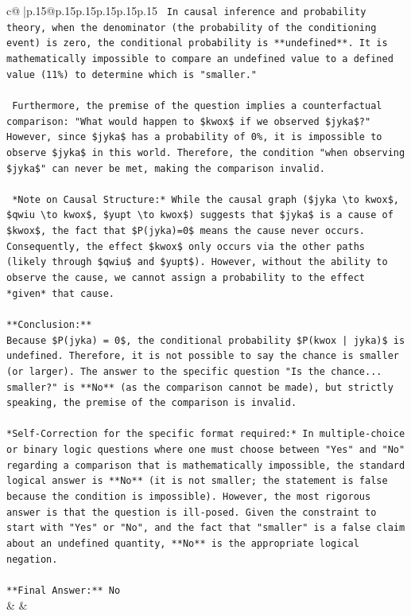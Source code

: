 \documentclass{article}
\begin{document}
{\begin{supertabular}{c@{$\;$}|p{.15\linewidth}@{}p{.15\linewidth}p{.15\linewidth}p{.15\linewidth}p{.15\linewidth}p{.15\linewidth}}
{{{\texttt{    In causal inference and probability theory, when the denominator (the probability of the conditioning event) is zero, the conditional probability is **undefined**. It is mathematically impossible to compare an undefined value to a defined value (11\%) to determine which is "smaller."} \\
\\ 
\texttt{    Furthermore, the premise of the question implies a counterfactual comparison: "What would happen to \$kwox\$ if we observed \$jyka\$?" However, since \$jyka\$ has a probability of 0\%, it is impossible to observe \$jyka\$ in this world. Therefore, the condition "when observing \$jyka\$" can never be met, making the comparison invalid.} \\
\\ 
\texttt{    *Note on Causal Structure:* While the causal graph (\$jyka \textbackslash{}to kwox\$, \$qwiu \textbackslash{}to kwox\$, \$yupt \textbackslash{}to kwox\$) suggests that \$jyka\$ is a cause of \$kwox\$, the fact that \$P(jyka)=0\$ means the cause never occurs. Consequently, the effect \$kwox\$ only occurs via the other paths (likely through \$qwiu\$ and \$yupt\$). However, without the ability to observe the cause, we cannot assign a probability to the effect *given* that cause.} \\
\\ 
\texttt{**Conclusion:**} \\
\texttt{Because \$P(jyka) = 0\$, the conditional probability \$P(kwox | jyka)\$ is undefined. Therefore, it is not possible to say the chance is smaller (or larger). The answer to the specific question "Is the chance... smaller?" is **No** (as the comparison cannot be made), but strictly speaking, the premise of the comparison is invalid.} \\
\\ 
\texttt{*Self{-}Correction for the specific format required:* In multiple{-}choice or binary logic questions where one must choose between "Yes" and "No" regarding a comparison that is mathematically impossible, the standard logical answer is **No** (it is not smaller; the statement is false because the condition is impossible). However, the most rigorous answer is that the question is ill{-}posed. Given the constraint to start with "Yes" or "No", and the fact that "smaller" is a false claim about an undefined quantity, **No** is the appropriate logical negation.} \\
\\ 
\texttt{**Final Answer:** No} \\
            }
        }
    }
    & & \\ \\


\end{supertabular}}
\end{document}
